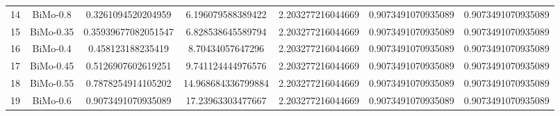 \documentclass[a4paper,10pt]{article}
\begin{document}
\begin{landscape}
\begin{table}[!htp]
\begin{tabular}{ccccccc}
14&BiMo-0.8&0.3261094520204959&6.196079588389422&2.203277216044669&0.9073491070935089&0.9073491070935089\\
15&BiMo-0.35&0.35939677082051547&6.828538645589794&2.203277216044669&0.9073491070935089&0.9073491070935089\\
16&BiMo-0.4&0.458123188235419&8.70434057647296&2.203277216044669&0.9073491070935089&0.9073491070935089\\
17&BiMo-0.45&0.5126907602619251&9.741124444976576&2.203277216044669&0.9073491070935089&0.9073491070935089\\
18&BiMo-0.55&0.7878254914105202&14.968684336799884&2.203277216044669&0.9073491070935089&0.9073491070935089\\
19&BiMo-0.6&0.9073491070935089&17.23963303477667&2.203277216044669&0.9073491070935089&0.9073491070935089\\
\hline
\end{tabular}
\end{table}


\end{landscape}
\end{document}
